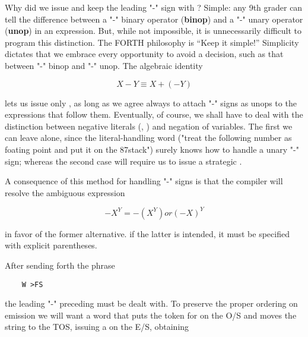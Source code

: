 \leftbar[1\linewidth]
Why did we issue  and keep the leading "-" sign with ? Simple: any 9th grader can tell the difference between a "-" binary operator (\textbf{binop}) and a "-" unary operator (\textbf{unop}) in an expression. But, while not impossible, it is unnecessarily difficult to program this distinction. The FORTH philosophy is “Keep it simple!” Simplicity dictates that we embrace every opportunity to avoid a decision, such as that between "-" binop and "-" unop. The algebraic identity
\endleftbar

\begin{equation*}
X - Y \equiv X + (-Y)
\end{equation*}

\leftbar[1\linewidth]
lets us issue only  , as long as we agree always to attach "-" signs as unops to the expressions that follow them. Eventually, of course, we shall have to deal with the distinction between negative literals (, \eg) and negation of variables. The first we can leave alone, since the literal-handling word \bc{\%} ("treat the following number as foating point and put it on the 87stack") surely knows how to handle a unary "-" sign; whereas the second case will require us to issue a strategic .
\endleftbar

A consequence of this method for handling "-" signs is that the
compiler will resolve the ambiguous expression

\begin{equation*}
-X^{Y} = -(X^{Y}) or (-X)^{Y}
\end{equation*}

in favor of the former alternative. if the latter is intended, it must be specified with explicit parentheses.

After sending forth the phrase

\begin{lstlisting}
    W >FS
\end{lstlisting}

the leading "-" preceding  must be dealt with. To preserve the proper ordering on emission we will want a word  that puts the token for  on the O/S and moves the string  to the TOS, issuing a  on the E/S, obtaining

